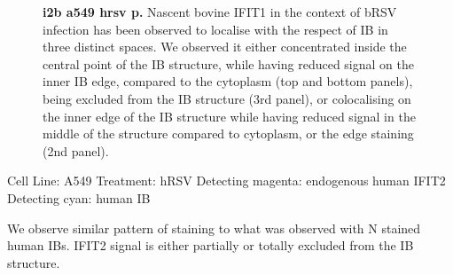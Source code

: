 \begin{figure}
\begin{subfigure}{1\textwidth}
    \end{subfigure}
    \caption[i2b a549 hrsv p]{\textbf{i2b a549 hrsv p.} Nascent bovine IFIT1 in the context of bRSV infection has been observed to localise with the respect of IB in three distinct spaces. We observed it either concentrated inside the central point of the IB structure, while having reduced signal on the inner IB edge, compared to the cytoplasm (top and bottom panels), being excluded from the IB structure (3rd panel), or colocalising on the inner edge of the IB structure while having reduced signal in the middle of the structure compared to cytoplasm, or the edge staining (2nd panel).}
    \label{fig:i2b a549 hrsv p}
\end{figure}

Cell Line: A549 \newline
Treatment: hRSV \newline
Detecting magenta: endogenous human IFIT2  \newline
Detecting cyan: human IB  \newline

We observe similar pattern of staining to what was observed with N stained human IBs. IFIT2 signal is either partially or totally excluded from the IB structure.

